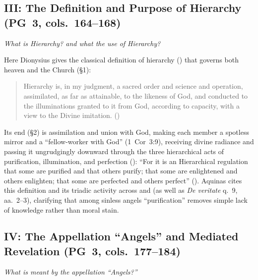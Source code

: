 \subsection{III: The Definition and Purpose of Hierarchy (PG~3, cols.~164--168)}
\label{sec:ch-iii}
\emph{What is Hierarchy? and what the use of Hierarchy?}

Here Dionysius gives the classical definition of hierarchy () that governs both heaven and the Church (\S 1):
\begin{quotation}
Hierarchy is, in my judgment, a sacred order and science and operation, assimilated, as far as attainable, to the likeness of God, and conducted to the illuminations granted to it from God, according to capacity, with a view to the Divine imitation. ()
\end{quotation}
Its end (\S 2) is assimilation and union with God, making each member a spotless mirror and a ``fellow-worker with God'' (1~Cor~3:9), receiving divine radiance and passing it ungrudgingly downward through the three hierarchical acts of purification, illumination, and perfection (): ``For it is an Hierarchical regulation that some are purified and that others purify; that some are enlightened and others enlighten; that some are perfected and others perfect'' (). Aquinas cites this definition and its triadic activity across  and  (as well as \emph{De veritate} q.~9, aa.~2--3), clarifying that among sinless angels ``purification'' removes simple lack of knowledge rather than moral stain.

\subsection{IV: The Appellation ``Angels'' and Mediated Revelation (PG~3, cols.~177--184)}
\label{sec:ch-iv}
\emph{What is meant by the appellation ``Angels?''}


